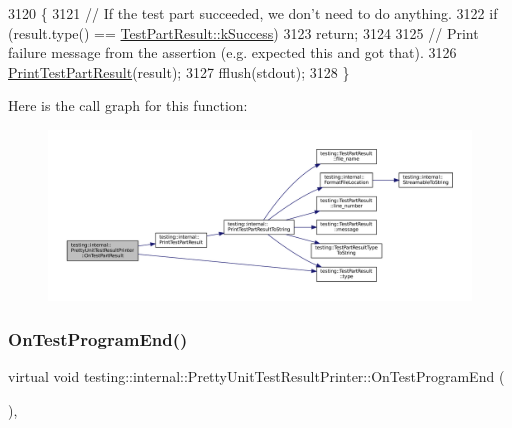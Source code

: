 \begin{DoxyCode}
3120                                   \{
3121   \textcolor{comment}{// If the test part succeeded, we don't need to do anything.}
3122   \textcolor{keywordflow}{if} (result.type() == \hyperlink{classtesting_1_1TestPartResult_a65ae656b33fdfdfffaf34858778a52d5a8fa3d06b2baad8bf7c1f17dea314983e}{TestPartResult::kSuccess})
3123     \textcolor{keywordflow}{return};
3124 
3125   \textcolor{comment}{// Print failure message from the assertion (e.g. expected this and got that).}
3126   \hyperlink{namespacetesting_1_1internal_ac844b3d05dd6f665f72e2a1cec1872ba}{PrintTestPartResult}(result);
3127   fflush(stdout);
3128 \}
\end{DoxyCode}
Here is the call graph for this function\+:
\nopagebreak
\begin{figure}[H]
\begin{center}
\leavevmode
\includegraphics[width=350pt]{classtesting_1_1internal_1_1PrettyUnitTestResultPrinter_a7589e8df7485349498a3a81bf16e2f68_cgraph}
\end{center}
\end{figure}
\mbox{\label{classtesting_1_1internal_1_1PrettyUnitTestResultPrinter_a8c92c062889abdb940b04ffe113f5980}} 
\subsubsection{\texorpdfstring{On\+Test\+Program\+End()}{OnTestProgramEnd()}}
{\footnotesize\ttfamily virtual void testing\+::internal\+::\+Pretty\+Unit\+Test\+Result\+Printer\+::\+On\+Test\+Program\+End (\begin{DoxyParamCaption}\item[{const \hyperlink{classtesting_1_1UnitTest}{Unit\+Test} \&}]{ }\end{DoxyParamCaption})\hspace{0.3cm}{\ttfamily [inline]}, {\ttfamily [virtual]}}



